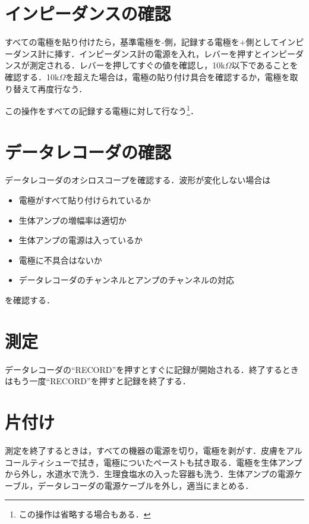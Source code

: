 \documentclass[a4j, twocolumn, openleft, uplatex, dvipdfmx]{jsbook}
\begin{document}
        \section{インピーダンスの確認}
        \label{sec:インピーダンスの確認}

            すべての電極を貼り付けたら，基準電極を-側，記録する電極を+側としてインピーダンス計に挿す．インピーダンス計の電源を入れ，レバーを押すとインピーダンスが測定される．レバーを押してすぐの値を確認し，10k$\Omega$以下であることを確認する．10k$\Omega$を超えた場合は，電極の貼り付け具合を確認するか，電極を取り替えて再度行なう．

            この操作をすべての記録する電極に対して行なう\footnote{この操作は省略する場合もある．}．

        \section{データレコーダの確認}
        \label{sec:データレコーダの確認}

            データレコーダのオシロスコープを確認する．波形が変化しない場合は
            \begin{itemize}
                \item 電極がすべて貼り付けられているか
                \item 生体アンプの増幅率は適切か
                \item 生体アンプの電源は入っているか
                \item 電極に不具合はないか
                \item データレコーダのチャンネルとアンプのチャンネルの対応
            \end{itemize}
            を確認する．

        \section{測定}
        \label{sec:測定}

            データレコーダの``\textsf{RECORD}''を押すとすぐに記録が開始される．終了するときはもう一度``\textsf{RECORD}''を押すと記録を終了する．

        \section{片付け}
        \label{sec:片付け}

        測定を終了するときは，すべての機器の電源を切り，電極を剥がす．皮膚をアルコールティシューで拭き，電極についたペーストも拭き取る．電極を生体アンプから外し，水道水で洗う．生理食塩水の入った容器も洗う．生体アンプの電源ケーブル，データレコーダの電源ケーブルを外し，適当にまとめる．
\end{document}
